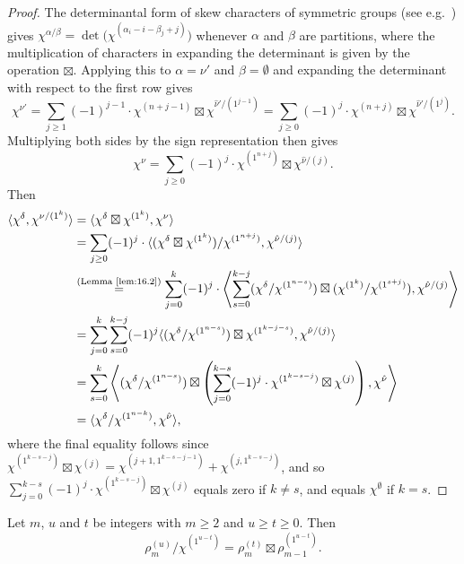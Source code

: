 \documentclass[ALCO, Unicode]{cedram}
\begin{document}
\begin{proof}
	The determinantal form of skew characters of symmetric groups (see e.g.~\cite[2.3.13]{JK}) gives $\chi^{\alpha/\beta} = \det\big(\chi^{(\alpha_i-i-\beta_j+j)}\big)$ whenever $\alpha$ and $\beta$ are partitions, where the multiplication of characters in expanding the determinant is given by the operation $\boxtimes$. Applying this to $\alpha=\nu'$ and $\beta=\emptyset$ and expanding the determinant with respect to the first row gives
	\[ \chi^{\nu'} = \sum_{j\ge 1} (-1)^{j-1}\cdot \chi^{(n+j-1)}\boxtimes \chi^{\hat{\nu}'/(1^{j-1})} = \sum_{j\ge 0} (-1)^j\cdot\chi^{(n+j)}\boxtimes \chi^{\hat{\nu}'/(1^j)}. \]
	Multiplying both sides by the sign representation then gives
	\[ \chi^\nu = \sum_{j\ge 0} (-1)^j\cdot \chi^{(1^{n+j})}\boxtimes \chi^{\hat{\nu}/(j)}. \]
	Then
	\begin{align*}
		\langle\chi^\delta,\chi^{\nu/(1^k)}\rangle &= \langle \chi^\delta\boxtimes\chi^{(1^k)},\chi^\nu\rangle \\
		&= \sum_{j\ge 0}(-1)^j\cdot\langle(\chi^\delta\boxtimes\chi^{(1^k)})/\chi^{(1^{n+j})}, \chi^{\hat{\nu}/(j)} \rangle\\
		&\overset{\normalfont\tiny \text{(Lemma~\ref{lem:16.2})}}{=} \sum_{j=0}^k (-1)^j\cdot \left\langle \sum_{s=0}^{k-j}(\chi^\delta/\chi^{(1^{n-s})})\boxtimes(\chi^{(1^k)}/\chi^{(1^{s+j})}), \chi^{\hat{\nu}/(j)}\right\rangle\\
		&=\sum_{j=0}^k \sum_{s=0}^{k-j}(-1)^j \langle (\chi^\delta/\chi^{(1^{n-s})})\boxtimes \chi^{(1^{k-j-s})}, \chi^{\hat{\nu}/(j)}\rangle\\
		&= \sum_{s=0}^k \left\langle (\chi^\delta/\chi^{(1^{n-s})})\boxtimes \left(\sum_{j=0}^{k-s}(-1)^j\cdot\chi^{(1^{k-s-j})}\boxtimes\chi^{(j)}\right), \chi^{\hat{\nu}}\right\rangle\\
		&=\langle \chi^\delta/\chi^{(1^{n-k})}, \chi^{\hat{\nu}}\rangle,
	\end{align*}
	where the final equality follows since $\chi^{(1^{k-s-j})}\boxtimes\chi^{(j)}=\chi^{(j+1,1^{k-s-j-1})}+\chi^{(j,1^{k-s-j})}$, and so $\sum_{j=0}^{k-s}(-1)^j\cdot\chi^{(1^{k-s-j})}\boxtimes\chi^{(j)}$ equals zero if $k\ne s$, and equals $\chi^\emptyset$ if $k=s$.
\end{proof}

\begin{lemma}\label{lem:16.6}
	Let $m$, $u$ and $t$ be integers with $m\ge 2$ and $u\ge t\ge 0$. Then
	\[ \rho^{(u)}_m/\chi^{(1^{u-t})} = \rho^{(t)}_m\boxtimes \rho^{(1^{u-t})}_{m-1}. \]
\end{lemma}
\end{document}
